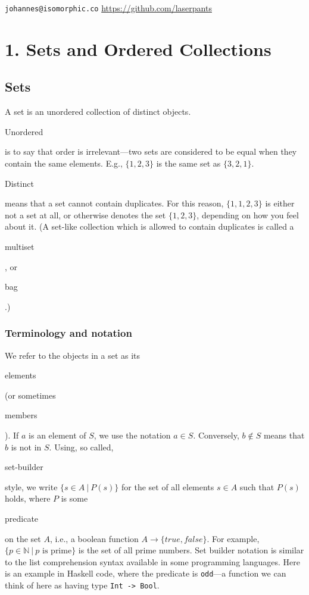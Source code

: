 \documentclass[11pt]{article}
\theoremstyle{plain}
\theoremstyle{definition}
\begin{document}
 
\noindent \verb|johannes@isomorphic.co| \hfill \url{https://github.com/laserpants} 

\section*{1. Sets and Ordered Collections}

\subsection*{Sets}

A set is an unordered collection of distinct objects. \begin{em}Unordered\end{em} is to say that order is irrelevant---two sets are considered to be equal when they contain the same elements. E.g., $ \{ 1, 2, 3 \} $ is the same set as $ \{ 3, 2, 1 \} $. \begin{em}Distinct\end{em} means that a set cannot contain duplicates. For this reason, $ \{ 1, 1, 2, 3 \} $ is either not a set at all, or otherwise denotes the set $ \{ 1, 2, 3 \} $, depending on how you feel about it. (A set-like collection which is allowed to contain duplicates is called a \begin{em}multiset\end{em}, or \begin{em}bag\end{em}.) 

\subsubsection*{Terminology and notation}

We refer to the objects in a set as its \begin{em}elements\end{em} (or sometimes \begin{em}members\end{em}). If $ a $ is an element of $ S $, we use the notation $ a \in S $. Conversely, $ b \notin S $ means that $ b $ is not in $ S $. Using, so called, \begin{em}set-builder\end{em} style, we write $ \{ s \in A \ | \ P(s) \} $ for the set of all elements $ s \in A $ such that $ P(s) $ holds, where $ P $ is some \begin{em}predicate\end{em} on the set $ A $, i.e., a boolean function $ A \rightarrow \{ true, false \} $. For example, $ \{ p \in \mathbb{N} \ | \ p \text{ is prime} \} $ is the set of all prime numbers. Set builder notation is similar to the list comprehension syntax available in some programming languages. Here is an example in Haskell code, where the predicate is \verb|odd|---a function we can think of here as having type \verb|Int -> Bool|.
\end{document}
